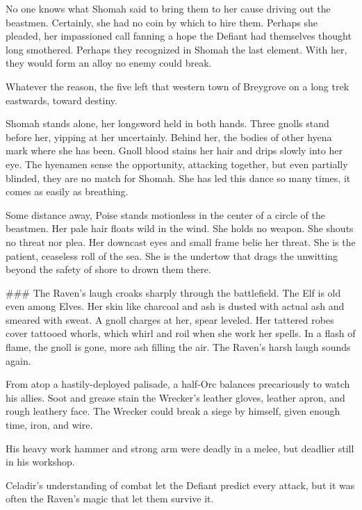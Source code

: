 No one knows what Shomah said to bring them to her cause driving out the beastmen.
Certainly, she had no coin by which to hire them.
Perhaps she pleaded, her impassioned call fanning a hope the Defiant had themselves
  thought long smothered.
Perhaps they recognized in Shomah the last element.
With her, they would form an alloy no enemy could break.

Whatever the reason, the five left that western town of Breygrove on a long trek eastwards, toward
destiny.

\hrulefill

Shomah stands alone, her longsword held in both hands.
Three gnolls stand before her, yipping at her uncertainly.
Behind her, the bodies of other hyena mark where she has been.
Gnoll blood stains her hair and drips slowly into her eye.
The hyenamen sense the opportunity, attacking together, but even partially blinded, they are no
  match for Shomah.
She has led this dance so many times, it comes as easily as breathing.

Some distance away, Poise stands motionless in the center of a circle of the beastmen.
Her pale hair floats wild in the wind.
She holds no weapon.
She shouts no threat nor plea.
Her downcast eyes and small frame belie her threat.
She is the patient, ceaseless roll of the sea.
She is the undertow that drags the unwitting beyond the safety of shore to drown them there.

###
The Raven's laugh croaks sharply through the battlefield.
The Elf is old even among Elves.
Her skin like charcoal and ash is dusted with actual ash and smeared with sweat.
A gnoll charges at her, spear leveled.
Her tattered robes cover tattooed whorls, which whirl and roil when she work her spells.
In a flash of flame, the gnoll is gone, more ash filling the air.
The Raven's harsh laugh sounds again.

From atop a hastily-deployed palisade, a half-Orc balances precariously to watch his allies.
Soot and grease stain the Wrecker's leather gloves, leather apron, and rough leathery face.
The Wrecker could break a siege by himself, given enough time, iron, and wire.

His heavy work hammer and strong arm were deadly in a melee, but deadlier still in his workshop.









Celadir's understanding of combat let the Defiant predict every attack,
but it was often the Raven's magic that let them survive it.


